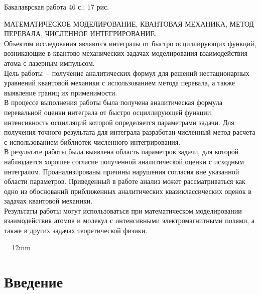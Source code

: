 \documentclass[%
bachelor,    %
natbib,      %
subf,        %
href,        %
colorlinks,  %
]{disser}
\newcommand{\sectionbreak}{\clearpage}
\begin{document}
\begin{flushleft}
	Бакалаврская работа 46 с., 17 рис.         \\
	\vspace{0.5cm}
	
МАТЕМАТИЧЕСКОЕ МОДЕЛИРОВАНИЕ, КВАНТОВАЯ МЕХАНИКА, МЕТОД ПЕРЕВАЛА, ЧИСЛЕННОЕ ИНТЕГРИРОВАНИЕ. \\	
	\vspace{0.5cm}
	Объектом исследования являются интегралы от быстро осциллирующих функций, возникающие в квантово-механических задачах моделирования взаимодействия атома с лазерным импульсом. \\
	\vspace{0.5cm}
	Цель работы~-- получение аналитических формул для решений нестационарных уравнений квантовой механики с использованием метода перевала, а также выявление границ их применимости.\\
	\vspace{0.5cm}
	В процессе выполнения работы была получена аналитическая формула перевальной оценки интеграла от быстро осциллирующей функции, интенсивность осцилляций которой определяется параметрами задачи. Для получения точного результата для интеграла разработан численный метод расчета с использованием библиотек численного интегрирования. \\
	\vspace{0.5cm}
	В результате работы была выявлена область параметров задачи, для которой наблюдается хорошее согласие полученной аналитической оценки с исходным интегралом. Проанализированы причины нарушения согласия вне указанной области параметров. Приведенный в работе анализ может рассматриваться как одно из обоснований приближенных аналитических квазиклассических оценок в задачах квантовой механики. \\
	\vspace{0.5cm}
	Результаты работы могут использоваться при математическом моделировании взаимодействия атомов и молекул с интенсивными электромагнитными полями, а также в других задачах теоретической физики.  
\end{flushleft}

{}
\parindent = 12mm

\thispagestyle{empty}
\tableofcontents
\sectionbreak
\section*{\centering Введение}
\end{document}

